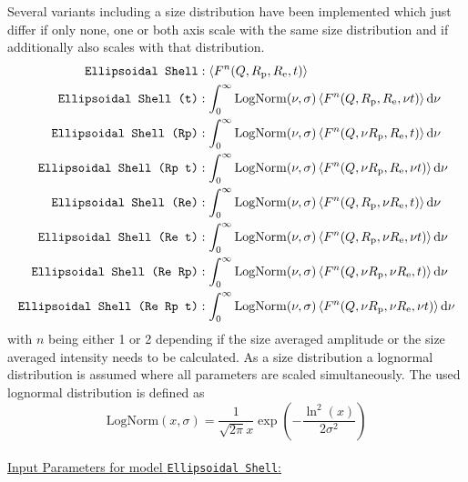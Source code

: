 Several variants including a size distribution have been implemented which just differ if only none, one or both axis scale with the same size distribution and if additionally also scales with that distribution.
\begin{align*}
\text{\texttt{Ellipsoidal Shell}}           &:                                            \left\langle F^n(Q,R_\mathrm{p},R_\mathrm{e},t)\right\rangle\\
\text{\texttt{Ellipsoidal Shell (t)}}       &: \int_0^\infty \mathrm{LogNorm}(\nu,\sigma) \left\langle F^n(Q,R_\mathrm{p},R_\mathrm{e},\nu t)\right\rangle \mathrm{d}\nu\\
\text{\texttt{Ellipsoidal Shell (Rp)}}      &: \int_0^\infty \mathrm{LogNorm}(\nu,\sigma) \left\langle F^n(Q,\nu R_\mathrm{p},R_\mathrm{e}, t)\right\rangle \mathrm{d}\nu\\
\text{\texttt{Ellipsoidal Shell (Rp t)}}    &: \int_0^\infty \mathrm{LogNorm}(\nu,\sigma) \left\langle F^n(Q,\nu R_\mathrm{p},R_\mathrm{e},\nu t)\right\rangle \mathrm{d}\nu\\
\text{\texttt{Ellipsoidal Shell (Re)}}      &: \int_0^\infty \mathrm{LogNorm}(\nu,\sigma) \left\langle F^n(Q,R_\mathrm{p},\nu R_\mathrm{e},t)\right\rangle \mathrm{d}\nu\\
\text{\texttt{Ellipsoidal Shell (Re t)}}    &: \int_0^\infty \mathrm{LogNorm}(\nu,\sigma) \left\langle F^n(Q,R_\mathrm{p},\nu R_\mathrm{e},\nu t)\right\rangle \mathrm{d}\nu\\
\text{\texttt{Ellipsoidal Shell (Re Rp)}}   &: \int_0^\infty \mathrm{LogNorm}(\nu,\sigma) \left\langle F^n(Q,\nu R_\mathrm{p},\nu R_\mathrm{e},t)\right\rangle \mathrm{d}\nu\\
\text{\texttt{Ellipsoidal Shell (Re Rp t)}} &: \int_0^\infty \mathrm{LogNorm}(\nu,\sigma) \left\langle F^n(Q,\nu R_\mathrm{p},\nu R_\mathrm{e},\nu t)\right\rangle \mathrm{d}\nu
\end{align*}
with $n$ being either 1 or 2 depending if the size averaged amplitude or the size averaged intensity needs to be calculated. As a size distribution a lognormal distribution is assumed where all parameters are scaled simultaneously. The used lognormal distribution is defined as
$$
\mathrm{LogNorm}(x,\sigma) = \frac{1}{\sqrt{2\pi}x} \exp\left(-\frac{\ln^2(x)}{2\sigma^2}\right)
$$
\vspace{0.5cm}
~\\
\uline{Input Parameters for model \texttt{Ellipsoidal Shell}:}
